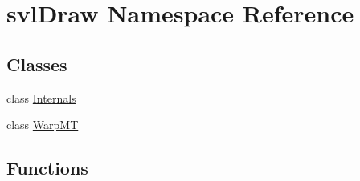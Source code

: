 \hypertarget{namespacesvl_draw}{}\section{svl\+Draw Namespace Reference}
\label{namespacesvl_draw}
\subsection*{Classes}
\begin{DoxyCompactItemize}
\item 
class \hyperlink{classsvl_draw_1_1_internals}{Internals}
\item 
class \hyperlink{classsvl_draw_1_1_warp_m_t}{Warp\+M\+T}
\end{DoxyCompactItemize}
\subsection*{Functions}
